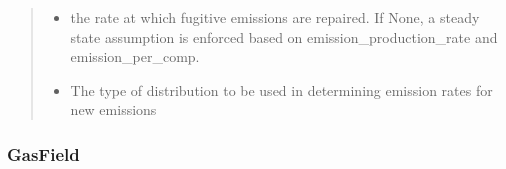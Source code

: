 \documentclass[letterpaper,10pt,english]{sphinxmanual}
\begin{document}
\begin{fulllineitems}
\begin{quote}
\begin{description}
\begin{itemize}
\item {} 
 \textendash{} the rate at which fugitive emissions are repaired. If None, a steady state
assumption is enforced based on emission\_production\_rate and emission\_per\_comp.

\item {} 
 \textendash{} The type of distribution to be used in determining emission rates for new emissions

\end{itemize}

\end{description}\end{quote}

\end{fulllineitems}



\subsubsection{GasField}
\label{\detokenize{index:gasfield}}
\end{document}
